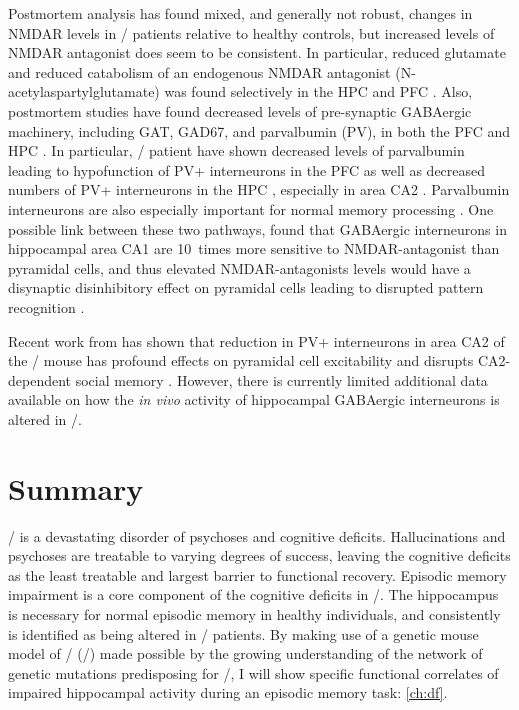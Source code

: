 Postmortem analysis has found mixed, and generally not robust, changes in NMDAR levels in \scz/ patients relative to healthy controls, but increased levels of NMDAR antagonist does seem to be consistent.
In particular, reduced glutamate and reduced catabolism of an endogenous NMDAR antagonist (N-acetylaspartylglutamate) was found selectively in the \ac{HPC} and \ac{PFC} \citep{Tsai1995}. 
Also, postmortem studies have found decreased levels of pre-synaptic GABAergic machinery, including GAT, GAD67, and parvalbumin (PV), in both the \ac{PFC} and HPC \citep{Coyle2006, Zhang2002, Konradi2011}.
In particular, \scz/ patient have shown decreased levels of parvalbumin leading to hypofunction of PV+ interneurons in the \ac{PFC} as well as decreased numbers of PV+ interneurons in the HPC \citep{Zhang2002, Lewis2005}, especially in area CA2 \citep{Knable2004}.
Parvalbumin interneurons are also especially important for normal memory processing \citep{Korotkova2010, Murray2011, Donato2013}.
One possible link between these two pathways, \citeauthor{Grunze1996} found that GABAergic interneurons in hippocampal area CA1 are 10~times more sensitive to NMDAR-antagonist than pyramidal cells, and thus elevated NMDAR-antagonists levels would have a disynaptic disinhibitory effect on pyramidal cells leading to disrupted pattern recognition \citep{Grunze1996}.

Recent work from \citeauthor{Piskorowski2016} has shown that reduction in PV+ interneurons in area CA2 of the \df/ mouse has profound effects on pyramidal cell excitability and disrupts CA2-dependent social memory \citep{Piskorowski2016}.
However, there is currently limited additional data available on how the \emph{in vivo} activity of hippocampal GABAergic interneurons is altered in \scz/.

\section{Summary}
\Scz/ is a devastating disorder of psychoses and cognitive deficits.
Hallucinations and psychoses are treatable to varying degrees of success, leaving the cognitive deficits as the least treatable and largest barrier to functional recovery.
Episodic memory impairment is a core component of the cognitive deficits in \scz/.
The hippocampus is necessary for normal episodic memory in healthy individuals, and consistently is identified as being altered in \scz/ patients.
By making use of a genetic mouse model of \scz/ (\df/) made possible by the growing understanding of the network of genetic mutations predisposing for \scz/, I will show specific functional correlates of impaired hippocampal activity during an episodic memory task: \autoref{ch:df}.